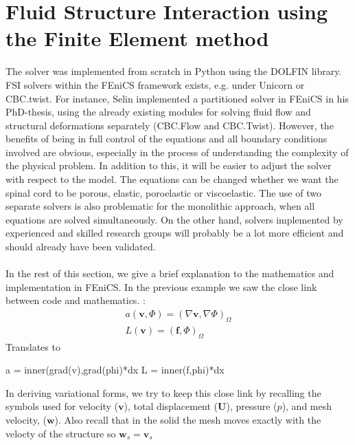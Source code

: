 \section{Fluid Structure Interaction using the Finite Element method}
The solver was implemented from scratch in Python using the DOLFIN library. FSI solvers within the FEniCS framework exists, e.g. under Unicorn or CBC.twist. For instance, Selin \cite{Seli11} implemented a partitioned solver in FEniCS in his PhD-thesis, using the already existing modules for solving fluid flow and structural deformations separately (CBC.Flow and CBC.Twist). However, the benefits of being in full control of the equations and all boundary conditions involved are obvious, especially in the process of understanding the complexity of the physical problem. In addition to this, it will be easier to adjust the solver with respect to the model. The equations can be changed whether we want the spinal cord to be porous, elastic, poroelastic or viscoelastic. The use of two separate solvers is also problematic for the monolithic approach, when all equations are solved simultaneously. On the other hand, solvers implemented by experienced and skilled research groups will probably be a lot more efficient and should already have been validated. 
\\
\\
In the rest of this section, we give a brief explanation to the mathematics and implementation in FEniCS. In the previous example we saw the close link between code and mathematics. :
\begin{align*}
a(\mathbf{v},\Phi) = (\nabla \mathbf{v}, \nabla \Phi)_\Omega \\
L(\mathbf{v}) = (\mathbf{f},\Phi)_\Omega
\end{align*}
Translates to
\begin{center}
\begin{cverbatim}
a = inner(grad(v),grad(phi)*dx
L = inner(f,phi)*dx
\end{cverbatim}
\end{center}
In deriving variational forms, we try to keep this close link by recalling the symbols used for velocity ($\mathbf{v}$), total displacement ($\mathbf{U}$), pressure ($p$), and mesh velocity, ($\mathbf{w}$). Also recall that in the solid the mesh moves exactly with the velocty of the structure so $\mathbf{w}_s = \mathbf{v}_s$
\\
